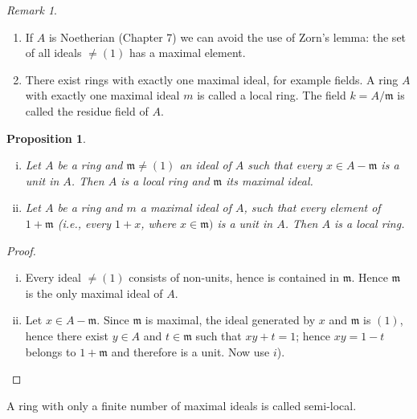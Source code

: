 \documentclass[class=book, crop=false]{standalone}
\newtheorem{proposition}[theorem]{Proposition}
\theoremstyle{definition}
\theoremstyle{remark}
\newtheorem*{remark}{Remark}
\begin{document}
\begin{remark}
  \begin{enumerate}
    \item If $A$ is Noetherian (Chapter 7) we can avoid the use of Zorn's lemma:
          the set of all ideals $\neq(1)$ has a maximal element.
    \item There exist rings with exactly one maximal ideal, for example fields.
          A ring $A$ with exactly one maximal ideal $m$ is called a local ring.
          The field $k=A / \mathfrak{m}$ is called the residue field of $A$.
  \end{enumerate}
\end{remark}
\begin{proposition}
  \begin{enumerate}[i)]
    \item Let $A$ be a ring and $\mathfrak{m} \neq(1)$ an ideal of $A$ such that
          every $x \in A-\mathfrak{m}$ is a unit in $A$. Then $A$ is a local
          ring and $\mathfrak{m}$ its maximal ideal.
    \item Let $A$ be a ring and $m$ a maximal ideal of $A$, such that every
          element of $1+\mathfrak{m}$ (i.e., every $1+x$, where
          $x \in \mathfrak{m})$ is a unit in $A$. Then $A$ is a local ring.
  \end{enumerate}
\end{proposition}
\begin{proof}
  \begin{enumerate}[i)]
    \item Every ideal $\neq(1)$ consists of non-units, hence is contained in
          $\mathfrak{m}$. Hence $\mathfrak{m}$ is the only maximal ideal of $A$.
    \item Let $x \in A-\mathfrak{m}$. Since $\mathfrak{m}$ is maximal, the ideal
          generated by $x$ and $\mathfrak{m}$ is $(1)$, hence there exist
          $y \in A$ and $t \in \mathfrak{m}$ such that $x y+t=1$; hence
          $x y=1-t$ belongs to $1+\mathfrak{m}$ and therefore is a unit. Now use
          $i$).
  \end{enumerate}
\end{proof}
A ring with only a finite number of maximal ideals is called semi-local.
\end{document}

